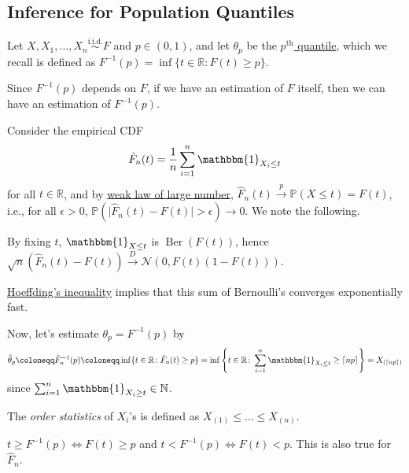 \subsection{Inference for Population Quantiles}
Let \(X, X_1, \dots , X_n \overset{\text{i.i.d.} }{\sim } F\) and \(p \in (0, 1)\), and let \(\theta _p\) be the \hyperref[def:quantile-function]{\(p^{\text{th} }\) quantile}, which we recall is defined as \(F^{-1} (p) = \inf \{ t \in \mathbb{R} \colon F(t) \geq p \} \).

\begin{intuition}
	Since \(F^{-1} (p)\) depends on \(F\), if we have an estimation of \(F\) itself, then we can have an estimation of \(F^{-1} (p)\).
\end{intuition}

Consider the empirical CDF
\[
	\hat{F} _n(t) = \frac{1}{n} \sum_{i=1}^{n} \mathbbm{1}_{X_i \leq t}
\]
for all \(t \in \mathbb{R} \), and by \hyperref[thm:WLLN]{weak law of large number}, \(\hat{F} _n(t) \overset{p}{\to} \mathbb{P} (X \leq t) = F(t)\), i.e., for all \(\epsilon > 0\), \(\mathbb{P} (\vert \hat{F} _n(t) - F(t) \vert > \epsilon ) \to 0\). We note the following.

\begin{note}
	By fixing \(t\), \(\mathbbm{1}_{X \leq t} \) is \(\operatorname{Ber}(F(t)) \), hence \(\sqrt{n} (\hat{F} _n(t) - F(t)) \overset{D}{\to} \mathcal{N} (0, F(t) (1 - F(t)))\).
\end{note}

\begin{note}
	\href{https://en.wikipedia.org/wiki/Hoeffding%27s_inequality}{Hoeffding's inequality} implies that this sum of Bernoulli's converges exponentially fast.
\end{note}

Now, let's estimate \(\theta _p = F^{-1} (p)\) by
\[
	\hat{\theta} _p
	\coloneqq \hat{F} _n ^{-1} (p)
	\coloneqq \inf \{ t \in \mathbb{R} \colon \hat{F} _n(t) \geq p \}
	= \inf \left\{ t \in \mathbb{R} \colon \sum_{i=1}^{n} \mathbbm{1}_{X_i \leq t} \geq \lceil np \rceil \right\}
	= X_{(\lceil np \rceil )}
\]
since \(\sum_{i=1}^{n} \mathbbm{1}_{X_i \geq t} \in \mathbb{N} \).

\begin{notation}
	The \emph{order statistics} of \(X_i\)'s is defined as \(X_{(1)} \leq \dots \leq X_{(n)}\).
\end{notation}

\begin{prev}
	\(t \geq F^{-1} (p) \iff F(t) \geq p\) and \(t < F^{-1} (p) \iff F(t) < p\). This is also true for \(\hat{F} _n\).
\end{prev}

